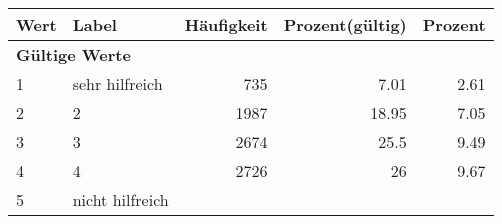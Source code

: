      \begin{longtable}{lXrrr}
     \toprule
     \textbf{Wert} & \textbf{Label} & \textbf{Häufigkeit} & \textbf{Prozent(gültig)} & \textbf{Prozent} \\
     \endhead
     \midrule
     \multicolumn{5}{l}{\textbf{Gültige Werte}}\\

     1 &
     \multicolumn{1}{X}{ sehr hilfreich   } &


       \num{735} &
       \num[round-mode=places,round-precision=2]{7,01} &
         \num[round-mode=places,round-precision=2]{2,61} \\

     2 &
     \multicolumn{1}{X}{ 2   } &


       \num{1987} &
       \num[round-mode=places,round-precision=2]{18,95} &
         \num[round-mode=places,round-precision=2]{7,05} \\

     3 &
     \multicolumn{1}{X}{ 3   } &


       \num{2674} &
       \num[round-mode=places,round-precision=2]{25,5} &
         \num[round-mode=places,round-precision=2]{9,49} \\

     4 &
     \multicolumn{1}{X}{ 4   } &


       \num{2726} &
       \num[round-mode=places,round-precision=2]{26} &
         \num[round-mode=places,round-precision=2]{9,67} \\

     5 &
     \multicolumn{1}{X}{ nicht hilfreich   } &



\end{longtable}
